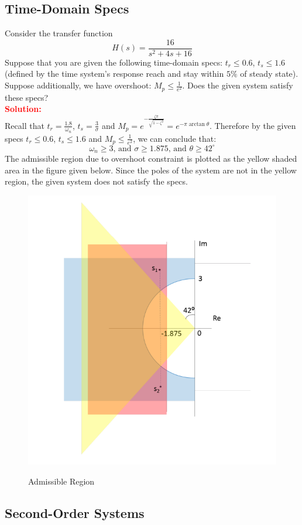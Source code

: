 \documentclass[12pt]{article}
\begin{document}
\subsection{Time-Domain Specs}
Consider the transfer function 
\[
H(s)=\frac{16}{s^2+4s+16}
\]
Suppose that you are given the following time-domain specs: $t_r \leq 0.6$, $t_s \leq 1.6$ (defined by the time system's response reach and stay within $5\%$ of steady state). Suppose additionally, we have overshoot: $M_p \leq \frac{1}{e^2}$. Does the given system satisfy these specs? \\
\textbf{\textcolor{red}{Solution:}} \\
Recall that $t_r=\frac{1.8}{\omega_n}$, $t_s=\frac{3}{\sigma}$ and $M_p =e^{-\frac{\zeta \pi}{\sqrt{1-\zeta^2}}}=e^{-\pi \arctan \theta}$. Therefore by the given specs $t_r \leq 0.6$, $t_s \leq 1.6$ and  $M_p \leq \frac{1}{e^2}$, we can conclude that:
\[
\omega_n \geq 3 \text{, and  } \sigma \geq 1.875 \text{, and  }  \theta \geq 42^\circ
\]
The admissible region due to overshoot constraint is plotted as the yellow shaded area in the figure given below. Since the poles of the system are not in the yellow region, the given system does not satisfy the specs.
\begin{figure}[H]
    \centering
    \includegraphics[width=0.65\linewidth]{figs/1.26.png}
    \label{fig:prb43}
    \caption{Admissible Region}
\end{figure}


\clearpage
\subsection{Second-Order Systems}
\end{document}

